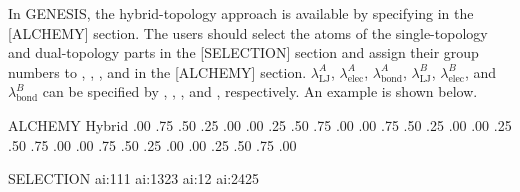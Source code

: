\documentclass[a4paper,11pt,oneside,english]{sphinxmanual}
\begin{document}
In GENESIS, the hybrid-topology approach is available by specifying  in the {[}ALCHEMY{]} section.
The users should select the atoms of the single-topology and dual-topology parts in the {[}SELECTION{]} section and assign their group numbers to , , , and  in the {[}ALCHEMY{]} section.
\(\lambda_{\text{LJ}}^{A}\), \(\lambda_{\text{elec}}^{A}\), \(\lambda_{\text{bond}}^{A}\), \(\lambda_{\text{LJ}}^{B}\), \(\lambda_{\text{elec}}^{B}\), and \(\lambda_{\text{bond}}^{B}\) can be specified by , , , and , respectively.
An example is shown below.

\begin{sphinxVerbatim}[commandchars=\\\{\}]
\PYG{o}{[}ALCHEMY\PYG{o}{]}
  Hybrid
         
         
           
           
       .00 .75 .50 .25 .00
       .00 .25 .50 .75 .00
       .00 .75 .50 .25 .00
       .00 .25 .50 .75 .00
     .00 .75 .50 .25 .00
     .00 .25 .50 .75 .00

\PYG{o}{[}SELECTION\PYG{o}{]}
        ai:1\PYGZhy{}11   
        ai:13\PYGZhy{}23  
        ai:12     
        ai:24\PYGZhy{}25  
\end{sphinxVerbatim}
\end{document}
